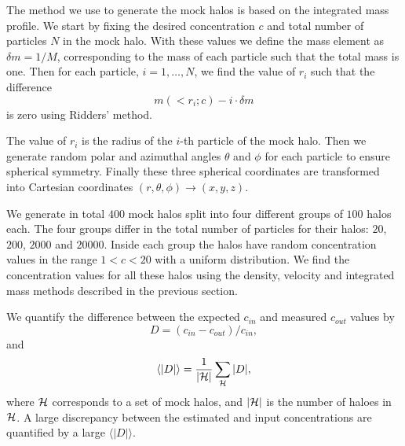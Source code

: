 \documentclass[a4,useAMS,usenatbib,usegraphicx]{mn2e}
\newcommand{\avg}[1]{\langle{#1}\rangle}
\begin{document}



The method we use to generate the mock halos is based on the
integrated mass profile.  
We start by fixing the desired concentration $c$ and total number of
particles $N$ in the mock halo.  
With these values we define the mass element as $\delta m = 1/M$, corresponding
to the mass of each particle such that the total mass is one.   
Then for each particle, $i=1,\ldots,N$, we find the value of $r_i$
such that the difference 
% 
\begin{equation}
m(<r_i;c) - i \cdot \delta m
\end{equation}
%
is zero using Ridders' method.

The value of $r_i$ is the radius of the $i$-th particle of the mock
halo.  
Then we generate random polar and azimuthal angles $\theta$ and
$\phi$ for each particle to ensure spherical symmetry.  
Finally these three spherical coordinates are transformed into
Cartesian coordinates $(r,\theta,\phi) \rightarrow (x,y,z)$.

We generate in total $400$ mock halos split into four different groups
of $100$ halos each.  
The four groups differ in the total number of particles for their
halos: $20$, $200$, $2000$ and $20000$.   
Inside each group the halos have random concentration values in the range
$1<c<20$ with a uniform distribution.  
We find the concentration values for all these halos using the
density, velocity and integrated mass methods described in the
previous section.    

We quantify the difference between the expected $c_{in}$ and measured
$c_{out}$ values by 
%
\begin{equation}
D=(c_{in}-c_{out})/c_{in},
\label{eq:D}
\end{equation}
%
and
%
\begin{equation}
\avg{|D|}=\frac{1}{\left|{\cal{H}}\right|}\sum_{{\cal{H}}} |D|,
\end{equation}
%
where ${\cal{H}}$ corresponds to a set of mock halos, and
$\left|{\cal{H}}\right|$ is the number of haloes in ${\cal{H}}$. 
A large discrepancy between the estimated and input concentrations are
quantified by a large $\avg{|D|}$.
\end{document}
